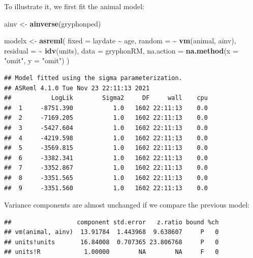 \documentclass[
  12pt,
]{book}
\newenvironment{Shaded}{\begin{snugshade}}{\end{snugshade}}
\newcommand{\DataTypeTok}[1]{\textcolor[rgb]{0.13,0.29,0.53}{#1}}
\newcommand{\KeywordTok}[1]{\textcolor[rgb]{0.13,0.29,0.53}{\textbf{#1}}}
\newcommand{\NormalTok}[1]{#1}
\newcommand{\OperatorTok}[1]{\textcolor[rgb]{0.81,0.36,0.00}{\textbf{#1}}}
\newcommand{\StringTok}[1]{\textcolor[rgb]{0.31,0.60,0.02}{#1}}
\begin{document}
To illustrate it, we first fit the animal model:

\begin{Shaded}
\begin{Highlighting}[]
\NormalTok{ainv \textless{}{-}}\StringTok{ }\KeywordTok{ainverse}\NormalTok{(gryphonped)}

\NormalTok{modelx \textless{}{-}}\StringTok{ }\KeywordTok{asreml}\NormalTok{(}
  \DataTypeTok{fixed =}\NormalTok{ laydate }\OperatorTok{\textasciitilde{}}\StringTok{ }\NormalTok{age,}
  \DataTypeTok{random =} \OperatorTok{\textasciitilde{}}\StringTok{ }\KeywordTok{vm}\NormalTok{(animal, ainv),}
  \DataTypeTok{residual =} \OperatorTok{\textasciitilde{}}\StringTok{ }\KeywordTok{idv}\NormalTok{(units),}
  \DataTypeTok{data =}\NormalTok{ gryphonRM,}
  \DataTypeTok{na.action =} \KeywordTok{na.method}\NormalTok{(}\DataTypeTok{x =} \StringTok{"omit"}\NormalTok{, }\DataTypeTok{y =} \StringTok{"omit"}\NormalTok{)}
\NormalTok{)}
\end{Highlighting}
\end{Shaded}

\begin{verbatim}
## Model fitted using the sigma parameterization.
## ASReml 4.1.0 Tue Nov 23 22:11:13 2021
##           LogLik        Sigma2     DF     wall    cpu
##  1     -8751.390           1.0   1602 22:11:13    0.0
##  2     -7169.205           1.0   1602 22:11:13    0.0
##  3     -5427.604           1.0   1602 22:11:13    0.0
##  4     -4219.598           1.0   1602 22:11:13    0.0
##  5     -3569.815           1.0   1602 22:11:13    0.0
##  6     -3382.341           1.0   1602 22:11:13    0.0
##  7     -3352.867           1.0   1602 22:11:13    0.0
##  8     -3351.565           1.0   1602 22:11:13    0.0
##  9     -3351.560           1.0   1602 22:11:13    0.0
\end{verbatim}

Variance components are almost unchanged if we compare the previous model:

\begin{Shaded}
\end{Shaded}

\begin{verbatim}
##                  component std.error   z.ratio bound %ch
## vm(animal, ainv)  13.91784  1.443968  9.638607     P   0
## units!units       16.84008  0.707365 23.806768     P   0
## units!R            1.00000        NA        NA     F   0
\end{verbatim}
\end{document}
